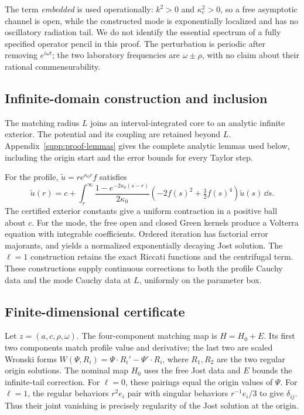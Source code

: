 The term \emph{embedded} is used operationally: $k^2>0$ and
$\kappa_c^2>0$, so a free asymptotic channel is open, while the constructed
mode is exponentially localized and has no oscillatory radiation tail.
We do not identify the essential spectrum of a fully specified operator
pencil in this proof. The perturbation is periodic after removing
$e^{i\omega t}$; the two laboratory frequencies are $\omega\pm\rho$,
with no claim about their rational commensurability.

\subsection{Infinite-domain construction and inclusion}
\label{sec:proof-tails}
The matching radius $L$ joins an interval-integrated core to an analytic
infinite exterior. The potential and its coupling are retained beyond
$L$. Appendix~\ref{supp:proof-lemmas} gives the complete
analytic lemmas used below, including the origin start and the error
bounds for every Taylor step.

For the profile, $\widetilde u=r e^{\kappa_0r}f$ satisfies
\begin{equation}
 \widetilde u(r)=c+\int_r^\infty
 \frac{1-e^{-2\kappa_0(s-r)}}{2\kappa_0}
 \left(-2f(s)^2+\tfrac32f(s)^4\right)\widetilde u(s)\,\dd s.
 \label{eq:proof-profile-volterra}
\end{equation}
The certified exterior constants give a uniform contraction in a positive
ball about $c$. For the mode, the free open and closed Green kernels
produce a Volterra equation with integrable coefficients. Ordered
iteration has factorial error majorants, and yields a normalized
exponentially decaying Jost solution. The $\ell=1$ construction retains
the exact Riccati functions and the centrifugal term. These constructions
supply continuous corrections to both the profile Cauchy data and the
mode Cauchy data at $L$, uniformly on the parameter box.

\subsection{Finite-dimensional certificate}
\label{sec:proof-krawczyk}
Let $z=(a,c,\rho,\omega)$. The four-component matching map is
$H=H_0+E$. Its first two components match profile value and derivative;
the last two are scaled Wronski forms
$W(\Psi,R_i)=\Psi\cdot R_i'-\Psi'\cdot R_i$, where $R_1,R_2$ are
the two regular origin solutions. The nominal map $H_0$ uses the free
Jost data and $E$ bounds the infinite-tail correction.
For $\ell=0$, these pairings equal the origin values of $\Psi$.
For $\ell=1$, the regular behaviors $r^2e_i$ pair with singular
behaviors $r^{-1}e_i/3$ to give $\delta_{ij}$. Thus their joint vanishing
is precisely regularity of the Jost solution at the origin.

